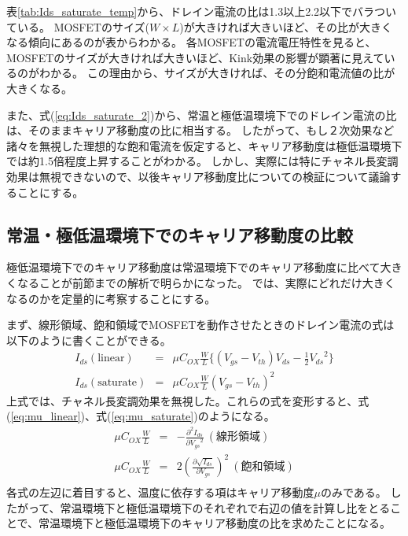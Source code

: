 			表\ref{tab:Ids_saturate_temp}から、ドレイン電流の比は1.3以上2.2以下でバラついている。
			MOSFETのサイズ($W \times L$)が大きければ大きいほど、その比が大きくなる傾向にあるのが表からわかる。
			各MOSFETの電流電圧特性を見ると、MOSFETのサイズが大きければ大きいほど、Kink効果の影響が顕著に見えているのがわかる。
			この理由から、サイズが大きければ、その分飽和電流値の比が大きくなる。
			
			また、式(\ref{eq:Ids_saturate_2})から、常温と極低温環境下でのドレイン電流の比は、そのままキャリア移動度の比に相当する。
			したがって、もし２次効果など諸々を無視した理想的な飽和電流を仮定すると、キャリア移動度は極低温環境下では約1.5倍程度上昇することがわかる。
			しかし、実際には特にチャネル長変調効果は無視できないので、以後キャリア移動度比についての検証について議論することにする。
			\clearpage
		\subsection{常温・極低温環境下でのキャリア移動度の比較}
			極低温環境下でのキャリア移動度は常温環境下でのキャリア移動度に比べて大きくなることが前節までの解析で明らかになった。
			では、実際にどれだけ大きくなるのかを定量的に考察することにする。
			
			まず、線形領域、飽和領域でMOSFETを動作させたときのドレイン電流の式は以下のように書くことができる。
			\begin{eqnarray}
				I_{ds}(\mathrm{linear}) & = & \mu C_{OX} \frac{W}{L} \{ (V_{gs} - V_{th})V_{ds} - \frac{1}{2}{V_{ds}}^2 \} \\
				I_{ds}(\mathrm{saturate}) & = & \mu C_{OX} \frac{W}{L} {(V_{gs} - V_{th})}^2
			\end{eqnarray}
			上式では、チャネル長変調効果を無視した。これらの式を変形すると、式(\ref{eq:mu_linear})、式(\ref{eq:mu_saturate})のようになる。
			\begin{eqnarray}
				\mu C_{OX} \frac{W}{L} & = & -\frac{{\partial}^2 I_{ds}}{\partial {V_{gs}}^2} \ \mathrm{(線形領域)}
				\label{eq:mu_linear} \\
				\mu C_{OX} \frac{W}{L} & = & 2 {(\frac{\partial \sqrt{I_{ds}}}{\partial V_{gs}})}^2 \ \mathrm{(飽和領域)}
				\label{eq:mu_saturate} \\
			\end{eqnarray}
			各式の左辺に着目すると、温度に依存する項はキャリア移動度$\mu$のみである。
			したがって、常温環境下と極低温環境下のそれぞれで右辺の値を計算し比をとることで、常温環境下と極低温環境下のキャリア移動度の比を求めたことになる。
			
